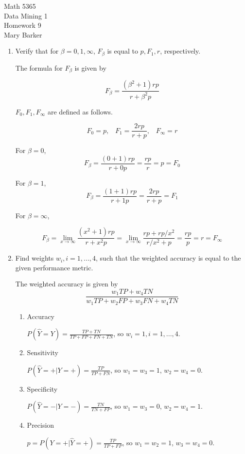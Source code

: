 \documentclass[11pt]{article}
\begin{document}
\noindent\large{Math 5365}\\
\large{Data Mining 1}\\
\large{Homework 9}\\
\large{Mary Barker}
\doublespace
\begin{enumerate}
\item Verify that for $\beta = 0, 1, \infty$, $F_\beta$ is equal to $p, F_1, r$, respectively. 

The formula for $F_\beta$ is given by 

$$
F_\beta = \frac{(\beta^2 + 1) rp}{r + \beta^2 p}
$$

$F_0, F_1, F_\infty$ are defined as follows. 

$$
F_0 = p,\;\;\; F_1 = \frac{2rp}{r + p},\;\;\; F_\infty = r
$$

For $\beta = 0$, 
$$F_\beta = \frac{(0 + 1)rp}{r + 0p} = \frac{rp}{r} = p = F_0$$ 

For $\beta = 1$, 
$$F_\beta = \frac{(1 + 1)rp}{r + 1p} = \frac{2rp}{r + p} = F_1$$ 

For $\beta = \infty$, 

$$F_\beta = \lim_{x \to \infty} \frac{(x^2 + 1)rp}{r + x^2p} = 
\lim_{x \to \infty} \frac{rp + rp / x^2}{r / x^2 + p} = \frac{rp }{p} = r = F_\infty$$ 

\item Find weights $w_i, i = 1, ... , 4$, such that the weighted accuracy is equal to the given 
performance metric. 

The weighted accuracy is given by 
$$
\frac{w_1 TP + w_4 TN}{w_1 TP + w_2 FP + w_3 FN + w_4 TN}
$$

  \begin{enumerate}
    \item Accuracy

          $P(\hat Y = Y) = \frac{TP + TN}{TP + FP + FN + TN}$, so $w_i = 1, i = 1, ... , 4$.

    \item Sensitivity

          $P(\hat Y = + | Y = +) = \frac{TP}{TP + FN}$, so $w_1 = w_3 = 1$, $w_2 = w_4 = 0$.

    \item Specificity

          $P(\hat Y = - | Y = -) = \frac{TN}{TN + FP}$, so $w_1 = w_3 = 0$, $w_2 = w_4 = 1$.

    \item Precision

          $p = P(Y = + | \hat Y = +) = \frac{TP}{TP + FP}$, so $w_1 = w_2 = 1$, $w_3 = w_4 = 0$.


\end{enumerate}
\end{enumerate}
\end{document}
